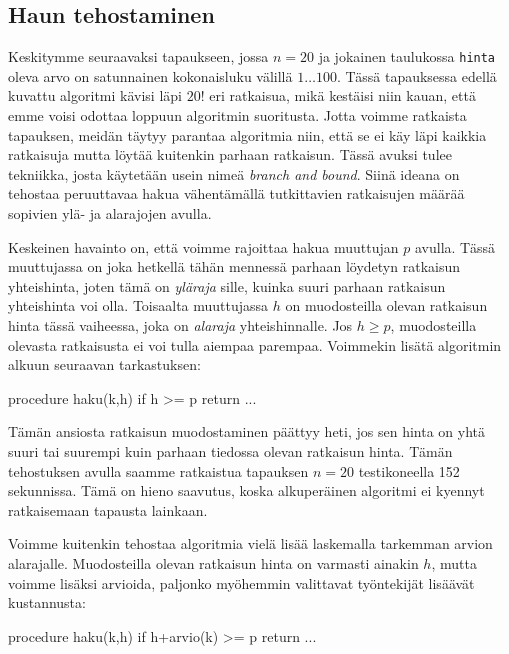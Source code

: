 \subsection{Haun tehostaminen}


Keskitymme seuraavaksi tapaukseen, jossa $n=20$ ja jokainen
taulukossa \texttt{hinta} oleva arvo on satunnainen
kokonaisluku välillä $1 \dots 100$.
Tässä tapauksessa edellä kuvattu algoritmi kävisi läpi $20!$ eri ratkaisua,
mikä kestäisi niin kauan, että emme voisi odottaa loppuun
algoritmin suoritusta.
Jotta voimme ratkaista tapauksen,
meidän täytyy parantaa algoritmia niin,
että se ei käy läpi kaikkia ratkaisuja
mutta löytää kuitenkin parhaan ratkaisun.
Tässä avuksi tulee tekniikka, josta käytetään usein nimeä
\emph{branch and bound}.
Siinä ideana on tehostaa peruuttavaa hakua
vähentämällä tutkittavien ratkaisujen määrää
sopivien ylä- ja alarajojen avulla.

Keskeinen havainto on, että voimme rajoittaa hakua muuttujan
$p$ avulla. Tässä muuttujassa on joka hetkellä
tähän mennessä parhaan löydetyn ratkaisun yhteishinta,
joten tämä on \emph{yläraja} sille, kuinka suuri parhaan ratkaisun
yhteishinta voi olla.
Toisaalta muuttujassa $h$ on muodosteilla olevan ratkaisun
hinta tässä vaiheessa, joka on \emph{alaraja} yhteishinnalle.
Jos $h \ge p$, muodosteilla olevasta ratkaisusta ei
voi tulla aiempaa parempaa. Voimmekin lisätä algoritmin alkuun
seuraavan tarkastuksen:

\begin{code}
procedure haku(k,h)
    if h >= p
        return
    ...
\end{code}

Tämän ansiosta ratkaisun muodostaminen päättyy heti,
jos sen hinta on yhtä suuri tai suurempi kuin parhaan
tiedossa olevan ratkaisun hinta.
Tämän tehostuksen avulla saamme ratkaistua tapauksen $n=20$
testikoneella 152 sekunnissa.
Tämä on hieno saavutus, koska alkuperäinen algoritmi
ei kyennyt ratkaisemaan tapausta lainkaan.

Voimme kuitenkin tehostaa algoritmia vielä lisää
laskemalla tarkemman arvion alarajalle.
Muodosteilla olevan ratkaisun hinta on varmasti ainakin $h$,
mutta voimme lisäksi arvioida, paljonko myöhemmin valittavat
työntekijät lisäävät kustannusta:

\begin{code}
procedure haku(k,h)
    if h+arvio(k) >= p
        return
    ...
\end{code}

